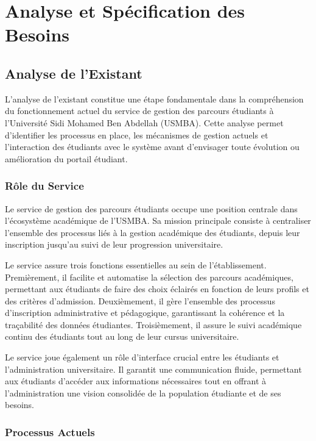 \documentclass[12pt,a4paper]{report}
\begin{document}
\chapter{Analyse et Spécification des Besoins}

\section{Analyse de l'Existant}

L'analyse de l'existant constitue une étape fondamentale dans la compréhension du fonctionnement actuel du service de gestion des parcours étudiants à l'Université Sidi Mohamed Ben Abdellah (USMBA). Cette analyse permet d'identifier les processus en place, les mécanismes de gestion actuels et l'interaction des étudiants avec le système avant d'envisager toute évolution ou amélioration du portail étudiant.

\subsection{Rôle du Service}

Le service de gestion des parcours étudiants occupe une position centrale dans l'écosystème académique de l'USMBA. Sa mission principale consiste à centraliser l'ensemble des processus liés à la gestion académique des étudiants, depuis leur inscription jusqu'au suivi de leur progression universitaire.

Le service assure trois fonctions essentielles au sein de l'établissement. Premièrement, il facilite et automatise la sélection des parcours académiques, permettant aux étudiants de faire des choix éclairés en fonction de leurs profils et des critères d'admission. Deuxièmement, il gère l'ensemble des processus d'inscription administrative et pédagogique, garantissant la cohérence et la traçabilité des données étudiantes. Troisièmement, il assure le suivi académique continu des étudiants tout au long de leur cursus universitaire.

Le service joue également un rôle d'interface crucial entre les étudiants et l'administration universitaire. Il garantit une communication fluide, permettant aux étudiants d'accéder aux informations nécessaires tout en offrant à l'administration une vision consolidée de la population étudiante et de ses besoins.

\subsection{Processus Actuels}
\end{document}
